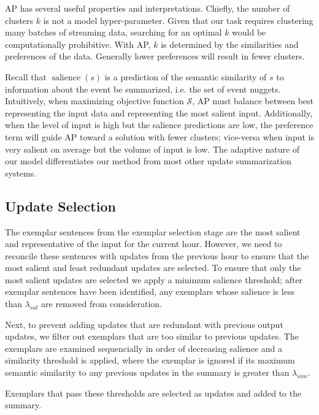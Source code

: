 
AP has several useful properties and interpretations. Chiefly, the number
of clusters $k$ is not a model hyper-parameter. Given that our task requires
clustering many batches of streaming data, searching for an optimal $k$ 
would be computationally prohibitive. With AP, $k$ is determined by the
similarities and preferences of the data. Generally lower preferences will
result in fewer clusters.  


Recall that $\operatorname{salience}(s)$
is a prediction of the semantic similarity of $s$ to information about the 
event be summarized, i.e. the set of event nuggets.
Intuitively, when maximizing objective function $\mathcal{S}$, AP must balance
between best representing the input data and representing the most salient
input. Additionally, when the level of input is high but the salience
predictions are low, the preference term will guide AP toward a solution
with fewer clusters; vice-versa when input is very salient on average but
the volume of input is low. The adaptive nature of our model differentiates
our method from most other update summarization systems.




\subsection{Update Selection}
\label{sec:upsel}

The exemplar sentences from the exemplar selection stage are the most 
salient and representative of the input for the current hour. However,
we need to reconcile these sentences with updates from the previous hour
to ensure that the most salient and least redundant  updates are selected.
To 
ensure that only the most salient updates are selected we apply a minimum
salience threshold;
after exemplar sentences have been identified, any exemplars whose salience is 
less than $\lambda_{sal}$ are removed from consideration. 

 Next,
to prevent adding updates that are redundant with previous output updates, 
we filter out exemplars
that are too similar to previous updates.
The exemplars are examined
sequencially in order of decreasing salience and  a similarity threshold 
is applied, where the exemplar is ignored if its
maximum semantic similarity to any previous updates in the summary is
greater than $\lambda_{sim}$.

Exemplars that pass these thresholds are selected as updates and added
to the summary.




